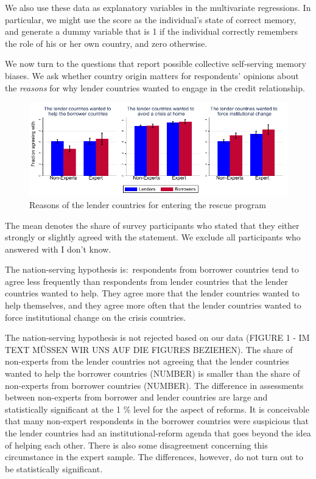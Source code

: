 We also use these data as explanatory variables in the multivariate
regressions. In particular, we might use the score as the
individual's state of correct memory, and generate a dummy variable that is
1 if the individual correctly remembers the role of his or her own country,
and zero otherwise. 

We now turn to the questions that report possible collective
self-serving memory biases. We ask whether country
origin matters for respondents' opinions about the \textit{reasons} for why lender countries wanted to engage in the credit relationship. 
\begin{figure}[h!]
\caption{Reasons of the lender countries for entering the rescue program}
    \centering
    \includegraphics[scale=1.2]{graph2.pdf}
  
    \label{fig:my_label}
\end{figure}

The mean denotes the share of survey participants who stated that they either strongly or slightly agreed with the statement. We exclude all participants who answered with I don't know.  

The nation-serving hypothesis is:\ respondents from borrower countries tend
to agree less frequently than respondents from lender countries 
that the lender countries wanted to help. They agree more that
the lender countries wanted to help themselves, and they agree more 
often that the lender countries wanted to force institutional change on the
crisis countries.\textit{\ }

The nation-serving hypothesis is not rejected based on our data (FIGURE 1 - IM TEXT MÜSSEN WIR UNS AUF DIE FIGURES BEZIEHEN). The share of non-experts from the lender countries not agreeing that the lender countries wanted to help the borrower countries (NUMBER) is smaller than the share of non-experts from borrower countries (NUMBER).
The difference in assessments between
non-experts from borrower and lender countries are large and statistically
significant at the 1 \% level for the aspect of reforms. It is conceivable that
many non-expert respondents in the borrower countries were suspicious that
the lender countries had an institutional-reform agenda that goes beyond the
idea of helping each other. There is also some disagreement concerning
this circumstance in the expert sample. The differences, however, do not turn out to be statistically significant. 


